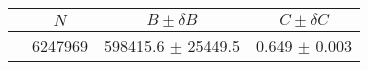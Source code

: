 \begin{tabular}{lccc}
\hline
    &   $N$   & $B \pm \delta B$  &  $C \pm \delta C$ \\
\hline
                               & 6247969    & 598415.6   $\pm$ 25449.5 & 0.649      $\pm$ 0.003 \\
\hline
\end{tabular}
